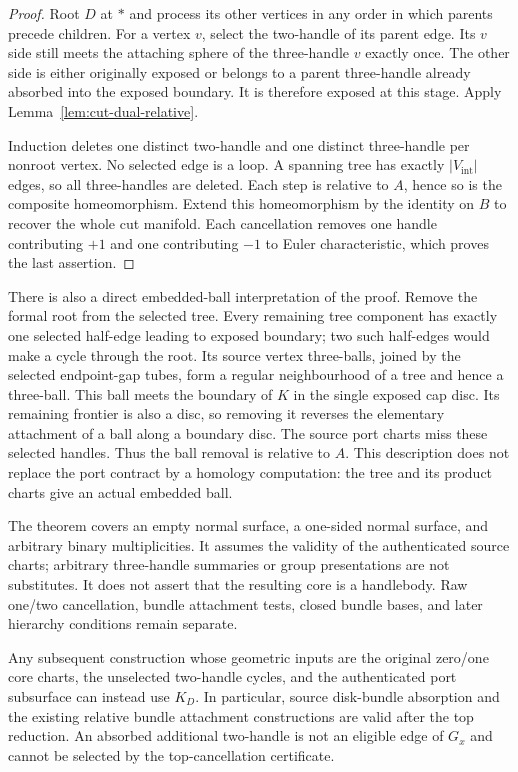 \begin{proof}
Root $D$ at $\ast$ and process its other vertices in any order in which
parents precede children.  For a vertex $v$, select the two-handle of its
parent edge.  Its $v$ side still meets the attaching sphere of the
three-handle $v$ exactly once.  The other side is either originally
exposed or belongs to a parent three-handle already absorbed into the
exposed boundary.  It is therefore exposed at this stage.  Apply
Lemma~\ref{lem:cut-dual-relative}.

Induction deletes one distinct two-handle and one distinct three-handle
per nonroot vertex.  No selected edge is a loop.  A spanning tree has
exactly $|V_{\mathrm{int}}|$ edges, so all three-handles are deleted.
Each step is relative to $A$, hence so is the composite homeomorphism.
Extend this homeomorphism by the identity on $B$ to recover the whole
cut manifold.  Each cancellation removes one handle contributing $+1$
and one contributing $-1$ to Euler characteristic, which proves the
last assertion.
\end{proof}

There is also a direct embedded-ball interpretation of the proof.
Remove the formal root from the selected tree.  Every remaining tree
component has exactly one selected half-edge leading to exposed boundary;
two such half-edges would make a cycle through the root.  Its source
vertex three-balls, joined by the selected endpoint-gap tubes, form a
regular neighbourhood of a tree and hence a three-ball.  This ball meets
the boundary of $K$ in the single exposed cap disc.  Its remaining
frontier is also a disc, so removing it reverses the elementary attachment
of a ball along a boundary disc.  The source port charts miss these
selected handles.  Thus the ball removal is relative to $A$.  This
description does not replace the port contract by a homology computation:
the tree and its product charts give an actual embedded ball.

The theorem covers an empty normal surface, a one-sided normal surface,
and arbitrary binary multiplicities.  It assumes the validity of the
authenticated source charts; arbitrary three-handle summaries or group
presentations are not substitutes.  It does not assert that the resulting
core is a handlebody.  Raw one/two cancellation, bundle attachment tests,
closed bundle bases, and later hierarchy conditions remain separate.

\begin{corollary}
\label{cor:cut-dual-consumers}
Any subsequent construction whose geometric inputs are the original
zero/one core charts, the unselected two-handle cycles, and the
authenticated port subsurface can instead use $K_D$.  In particular,
source disk-bundle absorption and the existing relative bundle attachment
constructions are valid after the top reduction.  An absorbed additional
two-handle is not an eligible edge of $G_x$ and cannot be selected by the
top-cancellation certificate.
\end{corollary}

